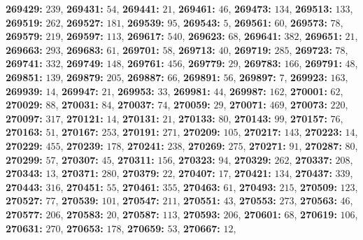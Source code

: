 \textsf{\bfseries 269429:} $239$, \textsf{\bfseries 269431:} $54$, \textsf{\bfseries 269441:} $21$, \textsf{\bfseries 269461:} $46$, \textsf{\bfseries 269473:} $134$, \textsf{\bfseries 269513:} $133$, \textsf{\bfseries 269519:} $262$, \textsf{\bfseries 269527:} $181$, \textsf{\bfseries 269539:} $95$, \textsf{\bfseries 269543:} $5$, \textsf{\bfseries 269561:} $60$, \textsf{\bfseries 269573:} $78$, \textsf{\bfseries 269579:} $219$, \textsf{\bfseries 269597:} $113$, \textsf{\bfseries 269617:} $540$, \textsf{\bfseries 269623:} $68$, \textsf{\bfseries 269641:} $382$, \textsf{\bfseries 269651:} $21$, \textsf{\bfseries 269663:} $293$, \textsf{\bfseries 269683:} $61$, \textsf{\bfseries 269701:} $58$, \textsf{\bfseries 269713:} $40$, \textsf{\bfseries 269719:} $285$, \textsf{\bfseries 269723:} $78$, \textsf{\bfseries 269741:} $332$, \textsf{\bfseries 269749:} $148$, \textsf{\bfseries 269761:} $456$, \textsf{\bfseries 269779:} $29$, \textsf{\bfseries 269783:} $166$, \textsf{\bfseries 269791:} $48$, \textsf{\bfseries 269851:} $139$, \textsf{\bfseries 269879:} $205$, \textsf{\bfseries 269887:} $66$, \textsf{\bfseries 269891:} $56$, \textsf{\bfseries 269897:} $7$, \textsf{\bfseries 269923:} $163$, \textsf{\bfseries 269939:} $14$, \textsf{\bfseries 269947:} $21$, \textsf{\bfseries 269953:} $33$, \textsf{\bfseries 269981:} $44$, \textsf{\bfseries 269987:} $162$, \textsf{\bfseries 270001:} $62$, \textsf{\bfseries 270029:} $88$, \textsf{\bfseries 270031:} $84$, \textsf{\bfseries 270037:} $74$, \textsf{\bfseries 270059:} $29$, \textsf{\bfseries 270071:} $469$, \textsf{\bfseries 270073:} $220$, \textsf{\bfseries 270097:} $317$, \textsf{\bfseries 270121:} $14$, \textsf{\bfseries 270131:} $21$, \textsf{\bfseries 270133:} $80$, \textsf{\bfseries 270143:} $99$, \textsf{\bfseries 270157:} $76$, \textsf{\bfseries 270163:} $51$, \textsf{\bfseries 270167:} $253$, \textsf{\bfseries 270191:} $271$, \textsf{\bfseries 270209:} $105$, \textsf{\bfseries 270217:} $143$, \textsf{\bfseries 270223:} $14$, \textsf{\bfseries 270229:} $455$, \textsf{\bfseries 270239:} $178$, \textsf{\bfseries 270241:} $238$, \textsf{\bfseries 270269:} $275$, \textsf{\bfseries 270271:} $91$, \textsf{\bfseries 270287:} $80$, \textsf{\bfseries 270299:} $57$, \textsf{\bfseries 270307:} $45$, \textsf{\bfseries 270311:} $156$, \textsf{\bfseries 270323:} $94$, \textsf{\bfseries 270329:} $262$, \textsf{\bfseries 270337:} $208$, \textsf{\bfseries 270343:} $13$, \textsf{\bfseries 270371:} $280$, \textsf{\bfseries 270379:} $22$, \textsf{\bfseries 270407:} $17$, \textsf{\bfseries 270421:} $134$, \textsf{\bfseries 270437:} $339$, \textsf{\bfseries 270443:} $316$, \textsf{\bfseries 270451:} $55$, \textsf{\bfseries 270461:} $355$, \textsf{\bfseries 270463:} $61$, \textsf{\bfseries 270493:} $215$, \textsf{\bfseries 270509:} $123$, \textsf{\bfseries 270527:} $77$, \textsf{\bfseries 270539:} $101$, \textsf{\bfseries 270547:} $211$, \textsf{\bfseries 270551:} $43$, \textsf{\bfseries 270553:} $273$, \textsf{\bfseries 270563:} $46$, \textsf{\bfseries 270577:} $206$, \textsf{\bfseries 270583:} $20$, \textsf{\bfseries 270587:} $113$, \textsf{\bfseries 270593:} $206$, \textsf{\bfseries 270601:} $68$, \textsf{\bfseries 270619:} $106$, \textsf{\bfseries 270631:} $270$, \textsf{\bfseries 270653:} $178$, \textsf{\bfseries 270659:} $53$, \textsf{\bfseries 270667:} $12$, 
